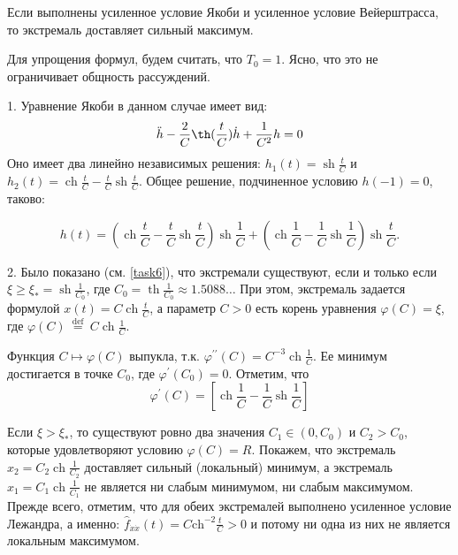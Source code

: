 \begin{task}
    \begin{theorem}
        Если выполнены усиленное 
        условие Якоби и усиленное условие Вейерштрасса, то экстремаль доставляет
        сильный максимум.
    \end{theorem}




Для упрощения формул, будем считать, что $T_0 = 1$. Ясно, что это не ограничивает общность рассуждений. \par
1. Уравнение Якоби в данном случае имеет вид:
\begin{equation*}
    \ddot{h}-\frac{2}{C} \th (\frac{t}{C}) \dot{h}+\frac{1}{C^2} h = 0    
\end{equation*}
Оно имеет два линейно независимых решения: 
$h_1(t)=\operatorname{sh} \frac{t}{C}$ и $h_2(t)=\operatorname{ch} \frac{t}{C}-\frac{t}{C} \operatorname{sh} \frac{t}{C}$. 
Общее решение, подчиненное условию $h(-1)=0$, таково:

\begin{equation*}
h(t)=\left(\operatorname{ch} \frac{t}{C}-\frac{t}{C} \operatorname{sh} \frac{t}{C}\right) \operatorname{sh} \frac{1}{C}+\left(\operatorname{ch} \frac{1}{C}-\frac{1}{C} \operatorname{sh} \frac{1}{C}\right) \operatorname{sh} \frac{t}{C} .
\end{equation*}

2. Было показано (см. \ref{task6}), что экстремали существуют, 
если и только если $\xi \geq \xi_{*}=\operatorname{sh} \frac{1}{C_0}$, 
где $C_0=\operatorname{th} \frac{1}{C_0} \approx 1.5088 \ldots$ При этом, экстремаль задается формулой 
$x(t)=C \operatorname{ch} \frac{t}{C}$, а параметр $C>0$ есть корень уравнения $\varphi(C) = \xi$, 
где $\varphi(C) \stackrel{\text { def }}{=} C \operatorname{ch} \frac{1}{C}$. 

Функция $C \mapsto \varphi(C)$ выпукла, т.к. $\varphi^{\prime \prime}(C)=C^{-3} \operatorname{ch} \frac{1}{C}$. 
Ее минимум достигается в точке $C_0$, где $\varphi^{\prime}\left(C_0\right)=0$. Отметим, что
$$
\varphi^{\prime}(C)=\left[\operatorname{ch} \frac{1}{C}-\frac{1}{C} \operatorname{sh} \frac{1}{C}\right]
$$

Если $\xi > \xi_{*}$, то существуют ровно два значения $C_1 \in\left(0, C_0\right)$ и $C_2>C_0$, 
которые удовлетворяют условию $\varphi(C)=R$. Покажем, что экстремаль $\widehat{x}_2=C_2 \operatorname{ch} \frac{1}{C_2}$ 
доставляет сильный (локальный) минимум, а экстремаль $\widehat{x}_1=C_1 \operatorname{ch} \frac{1}{C_1}$ 
не является ни слабым минимумом, ни слабым максимумом. Прежде всего, отметим, что для обеих экстремалей выполнено 
усиленное условие Лежандра, а именно: $\widehat{f}_{\dot{x} \dot{x}}(t)=C \mathrm{ch}^{-2} \frac{t}{C} > 0$ 
и потому ни одна из них не является локальным максимумом. \par



\end{task}
